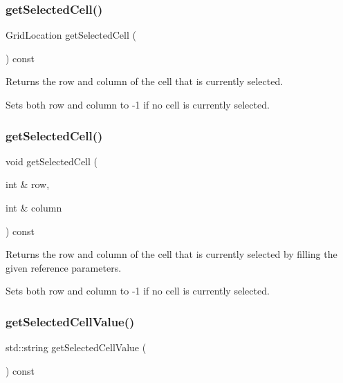 \subsubsection{\texorpdfstring{get\+Selected\+Cell()}{getSelectedCell()}\hspace{0.1cm}{\footnotesize\ttfamily [1/2]}}
{\footnotesize\ttfamily Grid\+Location get\+Selected\+Cell (\begin{DoxyParamCaption}{ }\end{DoxyParamCaption}) const\hspace{0.3cm}{\ttfamily [virtual]}}



Returns the row and column of the cell that is currently selected. 

Sets both row and column to -\/1 if no cell is currently selected. \mbox{\label{classGTable_a29b4e2e079037922545996e08f7ce6c4}} 
\subsubsection{\texorpdfstring{get\+Selected\+Cell()}{getSelectedCell()}\hspace{0.1cm}{\footnotesize\ttfamily [2/2]}}
{\footnotesize\ttfamily void get\+Selected\+Cell (\begin{DoxyParamCaption}\item[{int \&}]{row,  }\item[{int \&}]{column }\end{DoxyParamCaption}) const\hspace{0.3cm}{\ttfamily [virtual]}}



Returns the row and column of the cell that is currently selected by filling the given reference parameters. 

Sets both row and column to -\/1 if no cell is currently selected. \mbox{\label{classGTable_a8963c035a687a8393cd1f56ae05f582e}} 
\subsubsection{\texorpdfstring{get\+Selected\+Cell\+Value()}{getSelectedCellValue()}}
{\footnotesize\ttfamily std\+::string get\+Selected\+Cell\+Value (\begin{DoxyParamCaption}{ }\end{DoxyParamCaption}) const\hspace{0.3cm}{\ttfamily [virtual]}}



